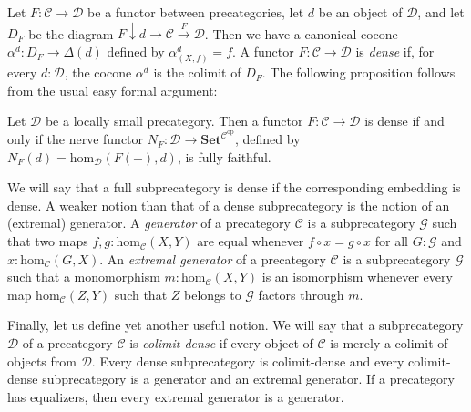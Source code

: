 \documentclass[reqno]{amsart}
\theoremstyle{definition}
\theoremstyle{remark}
\newcommand{\fs}[1]{\mathrm{#1}}
\newcommand{\cat}[1]{\mathbf{#1}}
\newcommand{\scat}[1]{\mathcal{#1}}
\renewcommand{\hom}{\fs{hom}}
\newcommand{\Set}{\cat{Set}}
\numberwithin{figure}{section}
\begin{document}
Let $F : \scat{C} \to \scat{D}$ be a functor between precategories, let $d$ be an object of $\scat{D}$, and let $D_F$ be the diagram $F \downarrow d \to \scat{C} \xrightarrow{F} \scat{D}$.
Then we have a canonical cocone $\alpha^d : D_F \to \Delta(d)$ defined by $\alpha^d_{(X,f)} = f$.
A functor $F : \scat{C} \to \scat{D}$ is \emph{dense} if, for every $d : \scat{D}$, the cocone $\alpha^d$ is the colimit of $D_F$.
The following proposition follows from the usual easy formal argument:

\begin{prop}
Let $\scat{D}$ be a locally small precategory.
Then a functor $F : \scat{C} \to \scat{D}$ is dense if and only if the nerve functor $N_F : \scat{D} \to \Set^{\scat{C}^\fs{op}}$, defined by $N_F(d) = \hom_\scat{D}(F(-),d)$, is fully faithful.
\end{prop}

We will say that a full subprecategory is dense if the corresponding embedding is dense.
A weaker notion than that of a dense subprecategory is the notion of an (extremal) generator.
A \emph{generator} of a precategory $\scat{C}$ is a subprecategory $\scat{G}$ such that two maps $f,g : \hom_\scat{C}(X,Y)$ are equal whenever $f \circ x = g \circ x$ for all $G : \scat{G}$ and $x : \hom_\scat{C}(G,X)$.
An \emph{extremal generator} of a precategory $\scat{C}$ is a subprecategory $\scat{G}$ such that a monomorphism $m : \hom_\scat{C}(X,Y)$ is an isomorphism whenever every map $\hom_\scat{C}(Z,Y)$ such that $Z$ belongs to $\scat{G}$ factors through $m$.

Finally, let us define yet another useful notion.
We will say that a subprecategory $\scat{D}$ of a precategory $\scat{C}$ is \emph{colimit-dense} if every object of $\scat{C}$ is merely a colimit of objects from $\scat{D}$.
Every dense subprecategory is colimit-dense and every colimit-dense subprecategory is a generator and an extremal generator.
If a precategory has equalizers, then every extremal generator is a generator.
\end{document}
